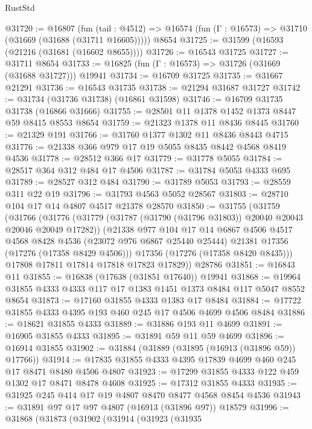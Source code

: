 \begin{lexlean}{RustStd}
\begin{coremodule}
@31720 := @16807
    (fun (tail : @4512) => @16574 (fun (Γ : @16573) => @31710 (@31669 (@31688 (@31711 @16605)))))
    @8654
@31725 := @31599 (@16593 (@21216 (@31681 (@16602 @8655))))
@31726 := @16543 @31725
@31727 := @31711 @8654
@31733 := @16825 (fun (Γ : @16573) => @31726 (@31669 (@31688 @31727))) @19941
@31734 := @16709 @31725
@31735 := @31667 @21291
@31736 := @16543 @31735
@31738 := @21294 @31687 @31727
@31742 := @31734 (@31736 @31738) (@16861 @31598)
@31746 := @16709 @31735 @31738 (@16866 @31666)
@31755 := @28501 @11 @1378 @1452 @1373 @8447 @59 @8415 @8553 @8654
@31759 := @21323 @1378 @11 @8436 @8445
@31760 := @21329 @191
@31766 := @31760 @1377 @1302 @11 @8436 @8443 @4715
@31776 := @21338 @366 @979 @17 @19 @5055 @8435 @8442 @4568 @8419 @4536
@31778 := @28512 @366 @17
@31779 := @31778 @5055
@31784 := @28517 @364 @312 @484 @17 @4506
@31787 := @31784 @5053 @4333 @695
@31789 := @28527 @312 @484
@31790 := @31789 @5053
@31793 := @28559 @311 @22 @19
@31796 := @31793 @4563 @5052 @28567
@31803 := @28710 @104 @17 @14 @4807 @4517 @21378 @28570
@31850 := @31755
    (@31759
      (@31766
        (@31776
          (@31779 (@31787 (@31790 (@31796 @31803)) @20040 @20043 @20046 @20049 @17282))
          (@21338
            @977
            @104
            @17
            @14
            @6867
            @4506
            @4517
            @4568
            @8428
            @4536
            (@23072 @976 @6867 @25440 @25444)
            @21381
            @17356
            (@17276 (@17358 @8429 @4506)))
          @17356
          (@17276 (@17358 @8420 @8435)))
        @17808
        @17811
        @17814
        @17818
        @17823
        @17829))
    @28786
@31851 := @16843 @11
@31855 := @16838 (@17638 (@31851 @17640)) @19941
@31868 := @19964 @31855 @4333 @4333 @117 @17 @1383 @1451 @1373 @8484 @117 @5047 @8552 @8654
@31873 := @17160 @31855 @4333 @1383 @17 @8484
@31884 := @17722 @31855 @4333 @4395 @193 @460 @245 @17 @4506 @4699 @4506 @8484
@31886 := @18621 @31855 @4333
@31889 := @31886 @193 @11 @4699
@31891 := @16905 @31855 @4333
@31895 := @31891 @59 @11 @59 @4699
@31896 := @16914 @31855
@31902 := @31884 (@31889 (@31895 (@16913 (@31896 @59)) @17766))
@31914 := @17835 @31855 @4333 @4395 @17839 @4699 @460 @245 @17 @8471 @8480 @4506 @4807
@31923 := @17299 @31855 @4333 @122 @459 @1302 @17 @8471 @8478 @4608
@31925 := @17312 @31855 @4333
@31935 := @31925 @245 @414 @17 @19 @4807 @8470 @8477 @4568 @8454 @4536
@31943 := @31891 @97 @17 @97 @4807 (@16913 (@31896 @97)) @18579
@31996 := @31868
    (@31873
      (@31902
        (@31914
          (@31923
            (@31935

\end{coremodule}
\end{lexlean}

